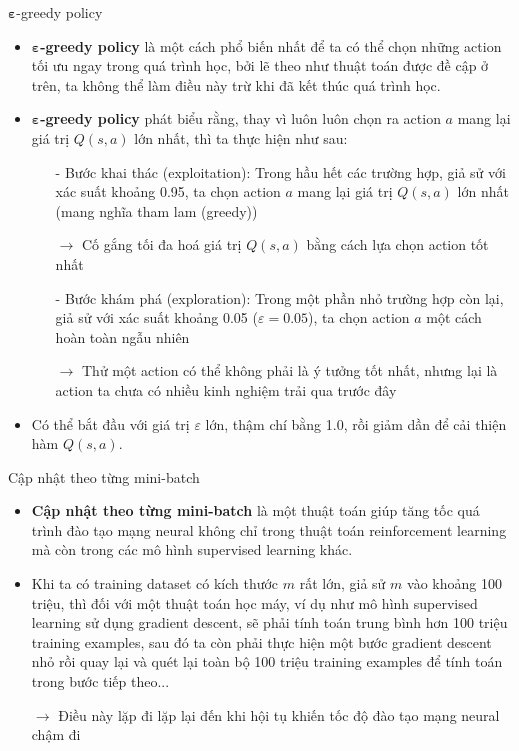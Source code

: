 \documentclass[10pt,aspectratio=169]{beamer}
\begin{document}
\begin{frame}{$ \boldsymbol{\varepsilon} $-greedy policy}{\subsecname}
\begin{itemize}
\setlength\itemsep{8pt}
\item \textbf{$ \boldsymbol{\varepsilon} $-greedy policy} là một cách phổ biến nhất để ta có thể chọn những action tối ưu ngay trong quá trình học, bởi lẽ theo như thuật toán được đề cập ở trên, ta không thể làm điều này trừ khi đã kết thúc quá trình học.
\item \textbf{$ \boldsymbol{\varepsilon} $-greedy policy} phát biểu rằng, thay vì luôn luôn chọn ra action $ a $ mang lại giá trị $ Q(s,a) $ lớn nhất, thì ta thực hiện như sau:
\begin{itemize}
\setlength\itemsep{4pt}
\item[-] \textcolor{mainblue}{Bước khai thác (exploitation):} Trong hầu hết các trường hợp, giả sử với xác suất khoảng 0.95, ta chọn action $ a $ mang lại giá trị $ Q(s,a) $ lớn nhất (mang nghĩa tham lam (greedy))
\item[] $ \rightarrow $ Cố gắng tối đa hoá giá trị $ Q(s,a) $ bằng cách lựa chọn action tốt nhất
\item[-] \textcolor{mainblue}{Bước khám phá (exploration):} Trong một phần nhỏ trường hợp còn lại, giả sử với xác suất khoảng 0.05 ($ \varepsilon = 0.05 $), ta chọn action $ a $ một cách hoàn toàn ngẫu nhiên
\item[] $ \rightarrow $ Thử một action có thể không phải là ý tưởng tốt nhất, nhưng lại là action ta chưa có nhiều kinh nghiệm trải qua trước đây
\end{itemize}
\item Có thể bắt đầu với giá trị $ \varepsilon $ lớn, thậm chí bằng 1.0, rồi giảm dần để cải thiện hàm $ Q(s,a) $.
\end{itemize}
\end{frame}

\begin{frame}{Cập nhật theo từng mini-batch}{\subsecname}
\begin{itemize}
\setlength\itemsep{8pt}
\item \textbf{Cập nhật theo từng mini-batch} là một thuật toán giúp tăng tốc quá trình đào tạo mạng neural không chỉ trong thuật toán reinforcement learning mà còn trong các mô hình supervised learning khác.
\item Khi ta có training dataset có kích thước $ m $ rất lớn, giả sử $ m $ vào khoảng 100 triệu, thì đối với một thuật toán học máy, ví dụ như mô hình supervised learning sử dụng gradient descent, sẽ phải tính toán trung bình hơn 100 triệu training examples, sau đó ta còn phải thực hiện một bước gradient descent nhỏ rồi quay lại và quét lại toàn bộ 100 triệu training examples để tính toán trong bước tiếp theo...
\item[] $ \longrightarrow $ Điều này lặp đi lặp lại đến khi hội tụ khiến tốc độ đào tạo mạng neural chậm đi
\end{itemize}
\end{frame}
\end{document}
